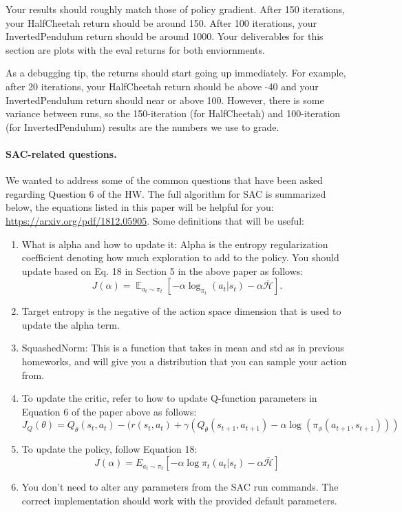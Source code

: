 \documentclass{article}
\begin{document}
Your results should roughly match those of policy gradient.
After 150 iterations, your HalfCheetah return should be around 150.
After 100 iterations, your InvertedPendulum return should be around 1000.
Your deliverables for this section are plots with the eval returns for both enviornments.

As a debugging tip, the returns should start going up immediately.
For example, after 20 iterations, your HalfCheetah return should be above -40 and your InvertedPendulum return should near or above 100.
However, there is some variance between runs, so the 150-iteration (for HalfCheetah) and 100-iteration (for InvertedPendulum) results are the numbers we use to grade.






\paragraph{SAC-related questions.} 
We wanted to address some of the common questions that have been asked regarding Question 6 of the HW. The full algorithm for SAC is summarized below, the equations listed in this paper will be helpful for you: {\url{https://arxiv.org/pdf/1812.05905}}. Some definitions that will be useful:
\begin{enumerate}
    \item What is alpha and how to update it: Alpha is the entropy regularization coefficient denoting how much exploration to add to the policy. You should update based on Eq. 18 in Section 5 in the above paper as follows: 
    $$
    J(\alpha)=\mathop{\mathbb{E}}_{a_t \sim \pi_t}[-\alpha\log_{\pi_t}(a_t|s_t) - \alpha\bar{\mathcal{H}}].
    $$
    \item Target entropy is the negative of the action space dimension that is used to update the alpha term.
    \item SquashedNorm: This is a function that takes in mean and std as in previous homeworks, and will give you a distribution that you can sample your action from. 
    \item To update the critic, refer to how to update Q-function parameters in Equation 6 of the paper above as follows: \\
    $$J_{Q}(\theta) = Q_{\theta}(s_t, a_t) - (r(s_t, a_t) + \gamma (Q_{\bar{\theta}}(s_{t+1}, a_{t+1}) - \alpha \log(\pi_{\phi}(a_{t+1}, s_{t+1})))$$
    \item To update the policy, follow Equation 18: \\
    $$J(\alpha) = E_{a_t \sim \pi_t} [- \alpha \log \pi_{t}(a_t|s_t) - \alpha \bar{\mathcal{H}}]$$
    \item You don't need to alter any parameters from the SAC run commands. The correct implementation should work with the provided default parameters.
    
\end{enumerate}
\end{document}
